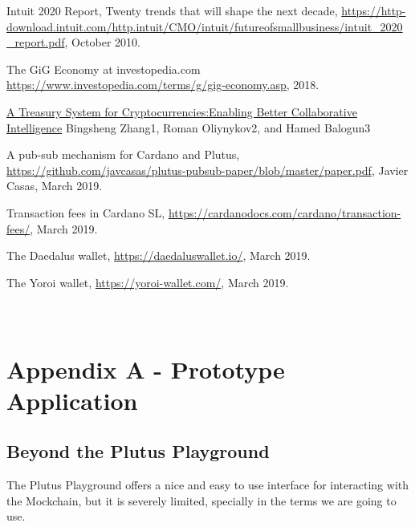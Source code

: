 \documentclass{article}
\begin{document}
\begin{thebibliography}{99}

 Intuit 2020 Report, Twenty trends that will shape the next decade, \url{https://http-download.intuit.com/http.intuit/CMO/intuit/futureofsmallbusiness/intuit_2020_report.pdf}, October 2010.

 The GiG Economy at investopedia.com \url{https://www.investopedia.com/terms/g/gig-economy.asp}, 2018.

\href{https://www.lancaster.ac.uk/staff/zhangb2/treasury.pdf}{A Treasury System for Cryptocurrencies:Enabling Better Collaborative Intelligence}
Bingsheng Zhang1, Roman Oliynykov2, and Hamed Balogun3

 A pub-sub mechanism for Cardano and Plutus, \url{https://github.com/javcasas/plutus-pubsub-paper/blob/master/paper.pdf}, Javier Casas, March 2019.

 Transaction fees in Cardano SL, \url{https://cardanodocs.com/cardano/transaction-fees/}, March 2019.

 The Daedalus wallet, \url{https://daedaluswallet.io/}, March 2019.

 The Yoroi wallet, \url{https://yoroi-wallet.com/}, March 2019.

\end{thebibliography}

\newpage
\appendix
\section{\\Appendix A - Prototype Application}

\subsection{Beyond the Plutus Playground}
The Plutus Playground offers a nice and easy to use interface for interacting with the Mockchain, but it is severely limited, specially in the terms we are going to use.
\end{document}

